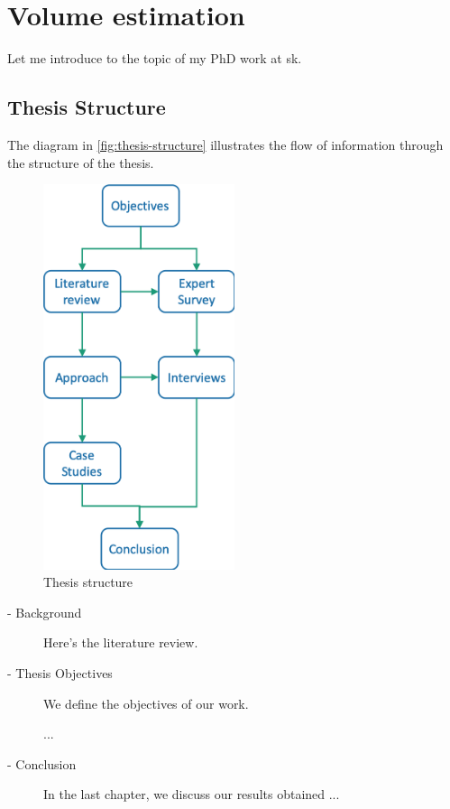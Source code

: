 \chapter{Volume estimation}

Let me introduce to the topic of my PhD work at \acrfull{sk}.


\section{Thesis Structure}
The diagram in \autoref{fig:thesis-structure} illustrates the flow of information through the structure of the thesis.

\begin{figure}[htb!]
\centering \includegraphics[width=0.5\textwidth]{graphics/thesis-structure}
\caption{Thesis structure}
\label{fig:thesis-structure}
\end{figure}

\begin{description}
    \item[ - Background]
Here's the literature review.

    \item[ - Thesis Objectives]
We define the objectives of our work.

...

    \item[ - Conclusion]
In the last chapter, we discuss our results obtained ...
\end{description}

